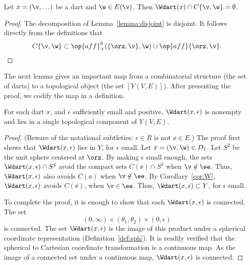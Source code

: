 \begin{corollary}[disjointness]\label{cor:W}
Let $x = (\v,\ldots)$ be a dart and $\w\in E(\v)$.
Then $\Wdart(x)\cap C\{\v,\w\}=\emptyset$.
\end{corollary}

\begin{proof} The decomposition of Lemma~\ref{lemma:disjoint} is
disjoint.  It follows directly from the definitions that
\begin{displaymath}C\{\v,\w\}\subset \op{aff}_+^0(\{\orz,\v\},\w) \cup 
\op{aff}\{\orz,\v\}.\end{displaymath}
\end{proof}

The next lemma gives an important map from a combinatorial structure (the
set of darts) to a topological object  (the set $[Y(V,E)]$).  After presenting the
proof, we  codify the map in a definition.

\begin{lemma} 
For each dart $x$, and $\epsilon$ sufficiently small and positive,
$\Wdart(x,\epsilon)$ is nonempty and lies in a single 
topological component of $Y(V,E)$.
\end{lemma}
%
%

\begin{proof} (Beware of the notational subtleties:
$\epsilon\in\ring{R}$ is not $\ee\in E$.)  The proof first shows
that $\Wdart(x,\epsilon)$ lies in $Y$, for $\epsilon$ small.  Let
$x=(\v,\w)\in D_1$.  Let $S^2$ be the unit sphere centered at
$\orz$.  By making $\epsilon$ small enough, the sets
$\Wdart(x,\epsilon)\cap S^2$ avoid the compact sets $C(\ee)\cap S^2$
when $\v\not\in \ee$.  Thus, $\Wdart(x,\epsilon)$ also avoids
$C(\ee)$ when $\v\not\in \ee$.  By Corollary~\ref{cor:W},
$\Wdart(x,\epsilon)$ avoids $C(\ee)$, when $\v\in \ee$.  Thus,
$\Wdart(x,\epsilon)\subset Y$, for $\epsilon$ small.

To complete the proof, it is enough to show that each
$\Wdart(x,\epsilon)$ is connected.  The set
\begin{displaymath}
(0,\infty) \times (\theta_1,\theta_2) \times (0,\epsilon)
\end{displaymath}
is connected.  The set $\Wdart(x,\epsilon)$ is the image of this
product under a spherical coordinate representation
(Definition~\ref{def:sph}).  %
It is readily verified that the spherical to Cartesian coordinate
transformation is a continuous map. As the image of a connected set
under a continuous map, $\Wdart(x,\epsilon)$ is connected.
\end{proof}
%
%




